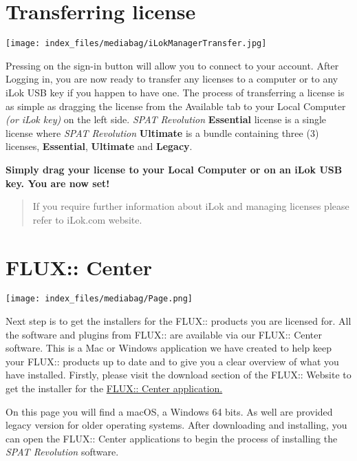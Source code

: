 \documentclass[
  letterpaper,
  DIV=11,
  numbers=noendperiod]{scrreport}
\begin{document}
\hypertarget{transferring-license}{%
\section{Transferring license}\label{transferring-license}}

\texttt{[image: index\_files/mediabag/iLokManagerTransfer.jpg]}

Pressing on the sign-in button will allow you to connect to your
account. After Logging in, you are now ready to transfer any licenses to
a computer or to any iLok USB key if you happen to have one. The process
of transferring a license is as simple as dragging the license from the
Available tab to your Local Computer \emph{(or iLok key)} on the left
side. \emph{SPAT Revolution} \textbf{Essential} license is a single
license where \emph{SPAT Revolution} \textbf{Ultimate} is a bundle
containing three (3) licenses, \textbf{Essential}, \textbf{Ultimate} and
\textbf{Legacy}.

\textbf{Simply drag your license to your Local Computer or on an iLok
USB key. You are now set!}

\begin{quote}
If you require further information about iLok and managing licenses
please refer to iLok.com website.
\end{quote}

\hypertarget{flux-center}{%
\section{FLUX:: Center}\label{flux-center}}

\texttt{[image: index\_files/mediabag/Page.png]}

Next step is to get the installers for the FLUX:: products you are
licensed for. All the software and plugins from FLUX:: are available via
our FLUX:: Center software. This is a Mac or Windows application we have
created to help keep your FLUX:: products up to date and to give you a
clear overview of what you have installed. Firstly, please visit the
download section of the FLUX:: Website to get the installer for the
\href{https://flux.audio/download/}{FLUX:: Center application.}

On this page you will find a macOS, a Windows 64 bits. As well are
provided legacy version for older operating systems. After downloading
and installing, you can open the FLUX:: Center applications to begin the
process of installing the \emph{SPAT Revolution} software.
\end{document}
